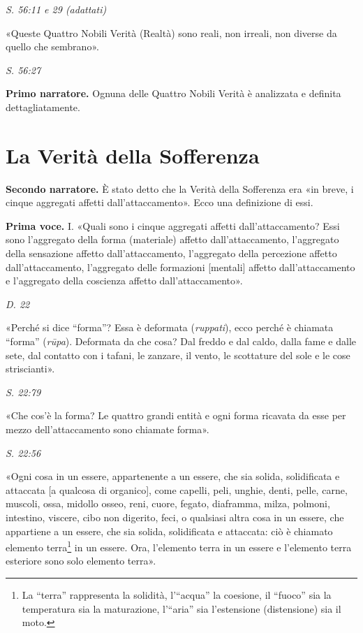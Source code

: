 \emph{S. 56:11 e 29 (adattati)}


«Queste Quattro Nobili Verità (Realtà) sono reali, non irreali, non
diverse da quello che sembrano».


\emph{S. 56:27}


\textbf{Primo narratore.} Ognuna delle Quattro Nobili Verità è analizzata e
definita dettagliatamente.


\hypertarget{x-la-verità-della-sofferenza}{\section*{La Verità della Sofferenza}}
\textbf{Secondo narratore.} È stato detto che la Verità della Sofferenza era «in
breve, i cinque aggregati affetti dall’attaccamento». Ecco una
definizione di essi.


\textbf{Prima voce.} I. «Quali sono i cinque aggregati affetti dall’attaccamento?
Essi sono l’aggregato della forma (materiale) affetto dall’attaccamento,
l’aggregato della sensazione affetto dall’attaccamento, l’aggregato
della percezione affetto dall’attaccamento, l’aggregato delle formazioni
[mentali] affetto dall’attaccamento e l’aggregato della coscienza
affetto dall’attaccamento».


\emph{D. 22}


«Perché si dice “forma”? Essa è deformata (\emph{ruppati}), ecco perché è
chiamata “forma” (\emph{rūpa}). Deformata da che cosa? Dal freddo e dal
caldo, dalla fame e dalle sete, dal contatto con i tafani, le zanzare,
il vento, le scottature del sole e le cose striscianti».


\emph{S. 22:79}


«Che cos’è la forma? Le quattro grandi entità e ogni forma ricavata da
esse per mezzo dell’attaccamento sono chiamate forma».


\emph{S. 22:56}


«Ogni cosa in un essere, appartenente a un essere, che sia solida,
solidificata e attaccata [a qualcosa di organico], come capelli, peli,
unghie, denti, pelle, carne, muscoli, ossa, midollo osseo, reni, cuore,
fegato, diaframma, milza, polmoni, intestino, viscere, cibo non
digerito, feci, o qualsiasi altra cosa in un essere, che appartiene a un
essere, che sia solida, solidificata e attaccata: ciò è chiamato
elemento terra\footnote{La “terra” rappresenta la solidità, l’“acqua” la coesione, il “fuoco” sia la temperatura sia la maturazione, l’“aria” sia l’estensione (distensione) sia il moto.} in un essere. Ora, l’elemento terra in
un essere e l’elemento terra esteriore sono solo elemento terra».


